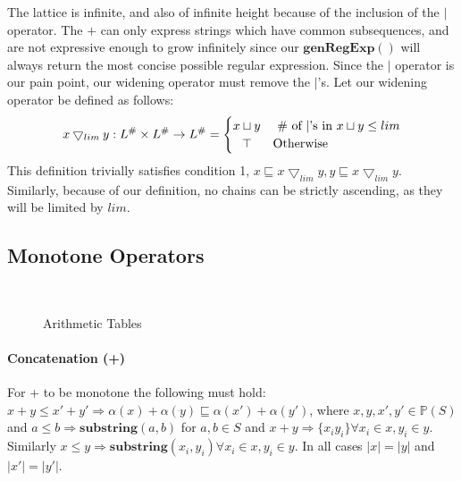 \documentclass{article}
\newcommand{\powerset}[1]{\mathbb{P}(#1)}
\newcommand{\genRegExp}[1]{\mathbf{genRegExp}(#1)}
\begin{document}
The lattice is infinite, and also of infinite height because of the inclusion of the $|$ operator. The $+$ can only express strings which have common subsequences, and are not expressive enough to grow infinitely since our $\genRegExp{}$ will always return the most concise possible regular expression.  Since the $|$ operator is our pain point, our widening operator must remove the $|$'s.  Let our widening operator be defined as follows:
\[
 x \bigtriangledown_{lim} y : L^\# \times L^\# \rightarrow L^\# =
  \begin{cases} 
      \hfill x \sqcup y    \hfill & \text{ \# of $|$'s in $x \sqcup y \leq lim$} \\
      \hfill \top \hfill & \text{Otherwise} \\
  \end{cases}
\]
This definition trivially satisfies condition 1,  $x \sqsubseteq x \bigtriangledown_{lim} y, y \sqsubseteq x \bigtriangledown_{lim} y$.  Similarly, because of our definition, no chains can be strictly ascending, as they will be limited by $lim$.

\subsection{Monotone Operators}
\begin{figure*}
\centering
{}~~~~
\caption{Arithmetic Tables}
\label{fig:table}
\end{figure*}


\paragraph{Concatenation (+)}
For + to be monotone the following must hold: $x+y \leq x'+y' \Rightarrow  \alpha(x)+\alpha(y) \sqsubseteq \alpha(x')+\alpha(y')$, where $x,y,x',y' \in \powerset{S}$ and $a \leq b \Rightarrow \mathbf{substring}(a,b)$ for $a,b \in S$ and $x+y \Rightarrow \{x_{i}y_i\} \forall x_i \in x, y_i \in y$.  Similarly $x \leq y \Rightarrow \mathbf{substring}(x_i, y_i) \forall x_i \in x, y_i \in y$.  In all cases $|x| = |y|$ and $|x'| = |y'|$.
\end{document}
